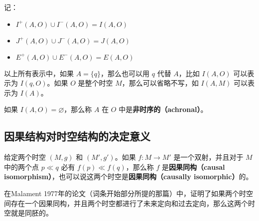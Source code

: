 记：
\begin{itemize}
\item $I^+(A, O)\cup I^-(A, O)=I(A,O)$
\item $J^+(A, O)\cup J^-(A, O)=J(A,O)$
\item $E^+(A, O)\cup E^-(A, O)=E(A,O)$
\end{itemize}

以上所有表示中，如果 $A=\{q\}$，那么也可以用 $q$ 代替 $A$，比如 $I(A, O)$ 可以表示为 $I(q, O)$。如果 $O$ 是整个时空 $M$，那么可以省略不写，如 $I(A, M)$ 可以表示为 $I(A)$。

如果 $I(A, O)=\varnothing$，那么称 $A$ 在 $O$ 中是\textbf{非时序的（achronal）}。

\subsection{因果结构对时空结构的决定意义}

给定两个时空 $(M, g)$ 和 $(M', g')$。如果 $f:M\rightarrow M'$ 是一个双射，并且对于 $M$ 中的两个点 $p\ll q$ 必有 $f(p)\ll f(q)$，那么称 $f$ 是\textbf{因果同构（causal isomorphism）}，也可以说这两个时空是\textbf{因果同构（causally isomorphic）}的。

在Malament 1977年的论文（词条开始部分所提的那篇）中，证明了如果两个时空间存在一个因果同构，并且两个时空都进行了未来定向和过去定向，那么这两个时空就是同胚的。







